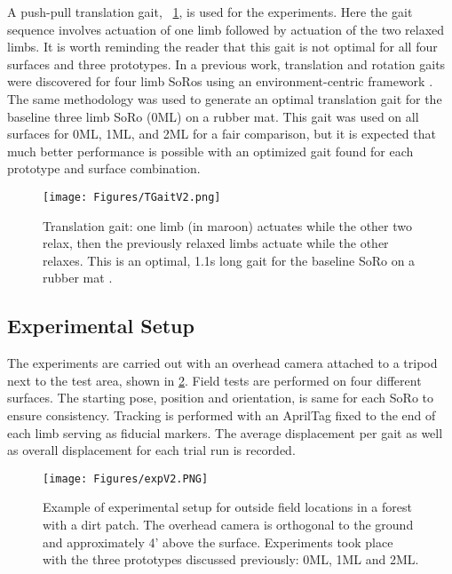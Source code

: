 A push-pull translation gait, \Fig~\ref{fig:trans}, is used for the experiments. Here the gait sequence involves actuation of one limb followed by actuation of the two relaxed limbs. It is worth reminding the reader that this gait is not optimal for all four surfaces and three prototypes. In a previous work, translation and rotation gaits were discovered for four limb SoRos using an environment-centric framework \cite{freeman2024environmentcentriclearningapproachgait}. The same methodology was used to generate an optimal translation gait for the baseline three limb SoRo (0ML) on a rubber mat. This gait was used on all surfaces for 0ML, 1ML, and 2ML for a fair comparison, but it is expected that much better performance is possible with an optimized gait found for each prototype and surface combination.

\begin{figure}[h]
    \centering
    \texttt{[image: Figures/TGaitV2.png]}
    \caption{Translation gait: one limb (in maroon) actuates while the other two relax, then the previously relaxed limbs actuate while the other relaxes. This is an optimal, 1.1s long gait for the baseline SoRo on a rubber mat \cite{freeman2024environmentcentriclearningapproachgait}.}
    \label{fig:trans}
\end{figure}


\subsection{Experimental Setup}
The experiments are carried out with an overhead camera attached to a tripod next to the test area, shown in \Fig \ref{fig:exp}. Field tests are performed on four different surfaces. The starting pose, position and orientation, is same for each SoRo to ensure consistency. Tracking is performed with an AprilTag fixed to the end of each limb serving as fiducial markers. The average displacement per gait as well as overall displacement for each trial run is recorded.

\begin{figure}[h]
    \centering
    \texttt{[image: Figures/expV2.PNG]}
    \caption{Example of experimental setup for outside field locations in a forest with a dirt patch. The overhead camera is orthogonal to the ground and approximately 4' above the surface. Experiments took place with the three prototypes discussed previously: 0ML, 1ML and 2ML.}
    \label{fig:exp}
\end{figure}


